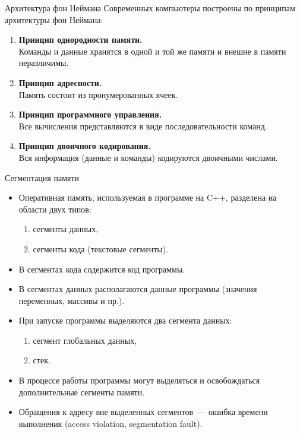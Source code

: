 \documentclass[aspectration=1610,t]{beamer}
\begin{document}
\begin{frame}[fragile]{Архитектура фон Неймана}
    Современных компьютеры построены по принципам 
    архитектуры фон Неймана:
    \begin{enumerate}
        \item {\bf Принцип однородности памяти.}\\
            Команды и данные хранятся в одной и той же памяти и внешне в памяти неразличимы.
        \item {\bf Принцип адресности.}\\
            Память состоит из пронумерованных ячеек.
        \item {\bf Принцип программного управления.}\\
            Все вычисления представляются в виде последовательности команд.
        \item {\bf Принцип двоичного кодирования.}\\
            Вся информация (данные и команды) кодируются двоичными числами.
    \end{enumerate}
\end{frame}

\begin{frame}[fragile]{Сегментация памяти}
    \begin{itemize}
        \item Оперативная память, используемая в программе на C++,
            разделена на области двух типов:
            \begin{enumerate}
                \item сегменты данных,
                \item сегменты кода (текстовые сегменты).
            \end{enumerate}
        \item В сегментах кода содержится код программы.
        \item В сегментах данных располагаются данные программы 
            (значения переменных, массивы и пр.).
        \item При запуске программы выделяются два сегмента данных:
            \begin{enumerate}
                \item сегмент глобальных данных,
                \item стек.
            \end{enumerate}
        \item В процессе работы программы могут выделяться и освобождаться
            дополнительные сегменты памяти.
        \item Обращения к адресу вне выделенных сегментов~--- ошибка времени
            выполнения (access violation, segmentation fault).
    \end{itemize}
\end{frame}
\end{document}

